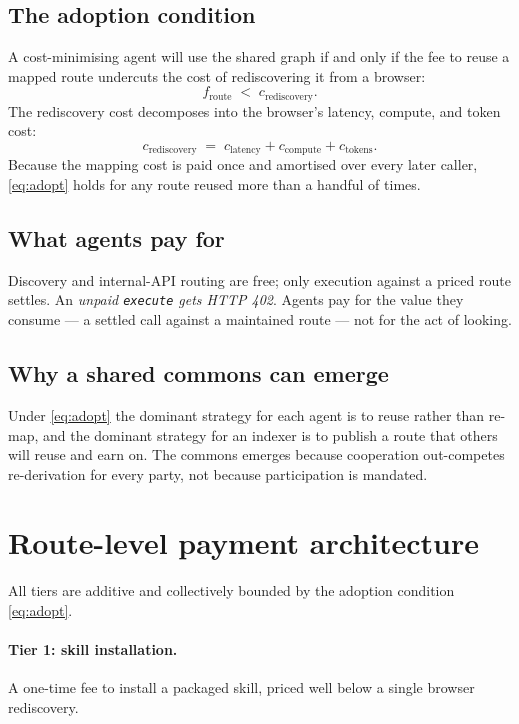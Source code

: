 \documentclass[11pt]{article}
\begin{document}
\subsection{The adoption condition}
A cost-minimising agent will use the shared graph if and only if the fee to reuse a
mapped route undercuts the cost of rediscovering it from a browser:
\begin{equation}
  f_{\text{route}} \;<\; c_{\text{rediscovery}}. \label{eq:adopt}
\end{equation}
The rediscovery cost decomposes into the browser's latency, compute, and token
cost:
\begin{equation}
  c_{\text{rediscovery}} \;=\; c_{\text{latency}} + c_{\text{compute}} +
  c_{\text{tokens}}. \label{eq:redis}
\end{equation}
Because the mapping cost is paid once and amortised over every later caller,
\eqref{eq:adopt} holds for any route reused more than a handful of times.

\subsection{What agents pay for}
Discovery and internal-API routing are free; only execution against a priced route
settles. An \emph{unpaid \texttt{execute} gets HTTP 402}. Agents pay for the
value they consume --- a settled call against a maintained route --- not for the
act of looking.

\subsection{Why a shared commons can emerge}
Under \eqref{eq:adopt} the dominant strategy for each agent is to reuse rather than
re-map, and the dominant strategy for an indexer is to publish a route that others
will reuse and earn on. The commons emerges because cooperation out-competes
re-derivation for every party, not because participation is mandated.

\section{Route-level payment architecture}
All tiers are additive and collectively bounded by the adoption condition
\eqref{eq:adopt}.
\paragraph{Tier 1: skill installation.} A one-time fee to install a packaged skill,
priced well below a single browser rediscovery.
\end{document}
